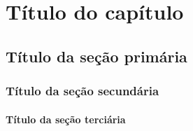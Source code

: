 \chapter[Título do capítulo]{Título do capítulo}

\section{Título da seção primária}
\subsection{Título da seção secundária}
\subsubsection{Título da seção terciária}

